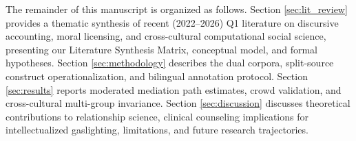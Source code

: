 The remainder of this manuscript is organized as follows. Section \ref{sec:lit_review} provides a thematic synthesis of recent (2022--2026) Q1 literature on discursive accounting, moral licensing, and cross-cultural computational social science, presenting our Literature Synthesis Matrix, conceptual model, and formal hypotheses. Section \ref{sec:methodology} describes the dual corpora, split-source construct operationalization, and bilingual annotation protocol. Section \ref{sec:results} reports moderated mediation path estimates, crowd validation, and cross-cultural multi-group invariance. Section \ref{sec:discussion} discusses theoretical contributions to relationship science, clinical counseling implications for intellectualized gaslighting, limitations, and future research trajectories.
